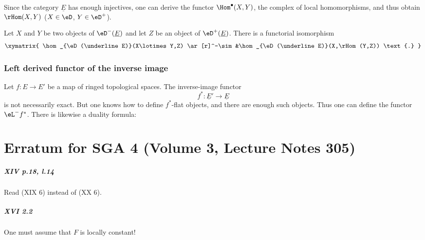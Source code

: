 Since the category $\underline E$ has enough injectives, one can derive
the functor $\Hom^\bullet(X,Y)$, the complex of local homomorphisms, and
thus obtain $\rHom(X,Y)$ ($X\in \eD$, $Y\in \eD^+$).

Let $X$ and $Y$ be two objects of $\eD^-(\underline E)$ and let $Z$ be an object
of $\eD^+(\underline E)$. There is a functorial isomorphism
\[\xymatrix{
  \hom_{\eD(\underline E)}(X\lotimes Y,Z) \ar[r]^-\sim
    &\hom_{\eD(\underline E)}(X,\rHom(Y,Z)) \text{.}
}\]

\subsection{Left derived functor of the inverse image}\label{VIII:6-3}

Let $f:E\to E'$ be a map of ringed topological spaces. The inverse-image
functor
\[
  f^\ast:\underline{E}' \to \underline E
\]
is not necessarily exact. But one knows how to define $f^\ast$-flat
objects, and there are enough such objects. Thus one can define the
functor $\eL^- f^\ast$. There is likewise a duality formula:



\appendix
\chapter{Erratum for SGA 4 (Volume 3, Lecture Notes 305)}

\paragraph{XIV p.18, l.14}
Read (XIX 6) instead of (XX 6).

\paragraph{XVI 2.2}
One must assume that $F$ is locally constant!

